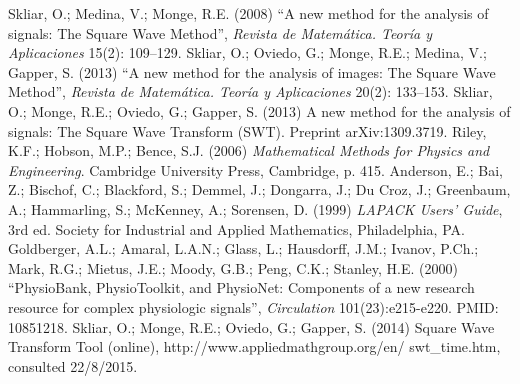 \documentclass[11pt]{rMTA2010} \usepackage[utf8]{inputenc} \usepackage{graphicx} \usepackage{booktabs} \usepackage{array} \usepackage{enumerate}
\begin{document}
\begin{thebibliography}{w}
Skliar, O.; Medina, V.; Monge, R.E. (2008) ``A new method for the analysis of signals: The Square Wave Method'', \textit{Revista de Matem\'atica. Teor\'ia y Aplicaciones} 15(2): 109--129.
Skliar, O.; Oviedo, G.; Monge, R.E.; Medina, V.; Gapper, S. (2013) ``A new method for the analysis of images: The Square Wave Method'', \textit{Revista de Matem\'atica. Teor\'ia y Aplicaciones} 20(2): 133--153.
 Skliar, O.; Monge, R.E.; Oviedo, G.; Gapper, S. (2013) A new method for the analysis of signals: The Square Wave Transform (SWT). Preprint arXiv:1309.3719.
Riley, K.F.; Hobson, M.P.; Bence, S.J. (2006) \textit{Mathematical Methods for Physics and Engineering}. Cambridge University Press, Cambridge, p. 415.
 Anderson, E.; Bai, Z.; Bischof, C.; Blackford, S.; Demmel, J.; Dongarra, J.; Du Croz, J.; Greenbaum, A.; Hammarling, S.; McKenney, A.; Sorensen, D. (1999) \textit{LAPACK Users' Guide}, 3rd ed. Society for Industrial and Applied Mathematics, Philadelphia, PA.
Goldberger, A.L.; Amaral, L.A.N.; Glass, L.; Hausdorff, J.M.; Ivanov, P.Ch.; Mark, R.G.; Mietus, J.E.; Moody, G.B.; Peng, C.K.; Stanley, H.E. (2000) ``PhysioBank, PhysioToolkit, and PhysioNet: Components of a new research resource for complex physiologic signals'', \textit{Circulation} 101(23):e215-e220. PMID: 10851218.
 Skliar, O.; Monge, R.E.; Oviedo, G.; Gapper, S. (2014) Square Wave Transform Tool   (online), http://www.appliedmathgroup.org/en/ swt\_time.htm, consulted 22/8/2015.

\end{thebibliography}
\end{document}
